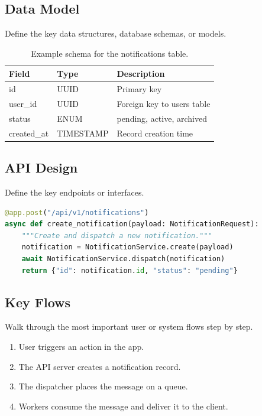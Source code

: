 \documentclass[11pt, a4paper]{article}
\begin{document}
\subsection{Data Model}

Define the key data structures, database schemas, or models.

\begin{table}[h]
    \centering
    \begin{tabular}{@{} l l l @{}}
        \toprule
        \textbf{Field} & \textbf{Type} & \textbf{Description} \\
        \midrule
        id             & UUID          & Primary key \\
        user\_id       & UUID          & Foreign key to users table \\
        status         & ENUM          & pending, active, archived \\
        created\_at    & TIMESTAMP     & Record creation time \\
        \bottomrule
    \end{tabular}
    \caption{Example schema for the notifications table.}
\end{table}

\subsection{API Design}

Define the key endpoints or interfaces.

\begin{lstlisting}[language=Python, caption={Example endpoint}]
@app.post("/api/v1/notifications")
async def create_notification(payload: NotificationRequest):
    """Create and dispatch a new notification."""
    notification = NotificationService.create(payload)
    await NotificationService.dispatch(notification)
    return {"id": notification.id, "status": "pending"}
\end{lstlisting}

\subsection{Key Flows}

Walk through the most important user or system flows step by step.

\begin{enumerate}
    \item User triggers an action in the app.
    \item The API server creates a notification record.
    \item The dispatcher places the message on a queue.
    \item Workers consume the message and deliver it to the client.
\end{enumerate}
\end{document}
